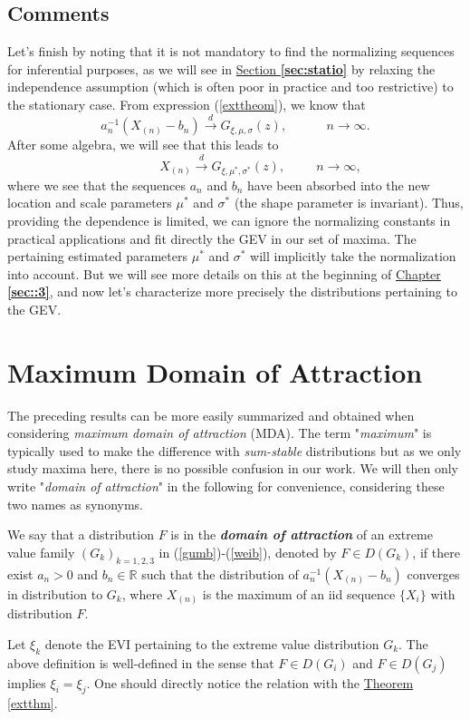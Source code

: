 \subsection*{Comments}
Let's finish by noting that it is not mandatory to find the normalizing sequences for inferential purposes, as we will see in \hyperref[sec:statio]{Section \textbf{\ref{sec:statio}}} by relaxing the independence assumption (which is often poor in practice and too restrictive) to the stationary case. From expression (\ref{exttheom}), we know that
\begin{equation} \label{convseq1}
a_n^{-1}(X_{(n)}-b_n)\stackrel{d}{\longrightarrow} G_{\xi,\mu,\sigma}(z), \ \ \ \ \qquad \ n\rightarrow\infty.
\end{equation}
After some algebra, we will see that this leads to 
\begin{equation}\label{convseq2}
\qquad \quad \quad X_{(n)}\stackrel{d}{\longrightarrow} G_{\xi,\mu^*,\sigma^*}(z), \  \quad \quad \ n\rightarrow\infty,
\end{equation}
where we see that the sequences $a_n$ and $b_n$ have been absorbed into the new location and scale parameters $\mu^*$ and $\sigma^*$ (the shape parameter is invariant). Thus, providing the dependence is limited, we can ignore the normalizing constants in practical applications and fit directly the GEV in our set of maxima.
The pertaining estimated parameters $\mu^*$ and $\sigma^*$ will implicitly take the normalization into account. But we will see more details on this at the beginning of \hyperref[sec::3]{Chapter \textbf{\ref{sec::3}}}, and now let's characterize more precisely the distributions pertaining to the GEV.

\section{Maximum Domain of Attraction}\label{sec:mda}

The preceding results can be more easily summarized and obtained when considering \emph{maximum domain of attraction} (MDA). The term "\emph{maximum}" is typically used to make the difference with \emph{sum-stable} distributions but as we only study maxima here, there is no possible confusion in our work. We will then only write "\emph{domain of attraction}" in the following for convenience, considering these two names as synonyms.

\begin{definition} We say that a distribution $F$ is in the \emph{\textbf{domain of attraction}} of an extreme value family $(G_{k})_{k=1,2,3}$ in (\ref{gumb})-(\ref{weib}), denoted by $F\in D(G_k)$, if there exist $a_n>0$ and $b_n\in\mathbb{R}$ such that the distribution of $a_n^{-1}(X_{(n)}-b_n)$ converges in distribution to $G_k$, where $X_{(n)}$ is the maximum of an iid sequence $\{X_i\}$ with distribution $F$. %
\end{definition}
Let $\xi_k$ denote the EVI pertaining to the extreme value distribution $G_k$. The above definition is well-defined in the sense that $F\in D(G_i)$ and $F\in D(G_j)$ implies $\xi_i=\xi_j$. One should directly notice the relation with the \hyperref[extthm]{Theorem \ref{extthm}}.


